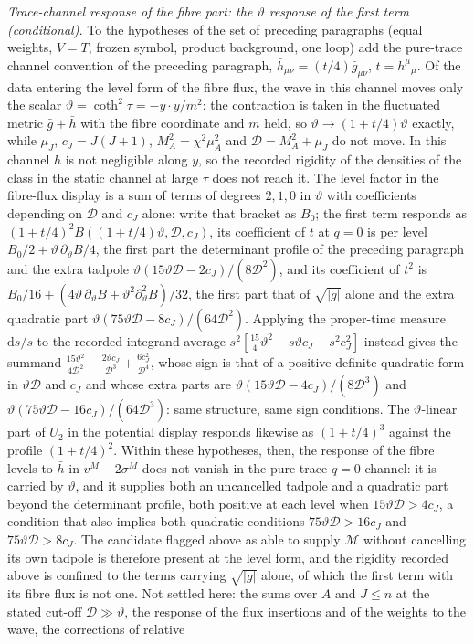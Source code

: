 \emph{Trace-channel response of the fibre part: the \(\vartheta\) response of the first term (conditional).} To the hypotheses of the set of preceding paragraphs (equal weights, \(V=T\), frozen symbol, product background, one loop) add the pure-trace channel convention of the preceding paragraph, \(\bar h_{\mu\nu}=(t/4)\bar g_{\mu\nu}\), \(t=h^\mu{}_\mu\). Of the data entering the level form of the fibre flux, the wave in this channel moves only the scalar \(\vartheta=\coth^2\tau=-y\cdot y/m^2\): the contraction is taken in the fluctuated metric \(\bar g+\bar h\) with the fibre coordinate and \(m\) held, so \(\vartheta\to(1+t/4)\vartheta\) exactly, while \(\mu_J\), \(c_J=J(J+1)\), \(M_A^2=\chi^2\mu_A^2\) and \(\mathcal D=M_A^2+\mu_J\) do not move. In this channel \(\bar h\) is not negligible along \(y\), so the recorded rigidity of the densities of the class in the static channel at large \(\tau\) does not reach it. The level factor in the fibre-flux display is a sum of terms of degrees \(2,1,0\) in \(\vartheta\) with coefficients depending on \(\mathcal D\) and \(c_J\) alone: write that bracket as \(B_0\); the first term responds as \((1+t/4)^2B((1+t/4)\vartheta,\mathcal D,c_J)\), its coefficient of \(t\) at \(q=0\) is per level \(B_0/2+\vartheta\,\partial_\vartheta B/4\), the first part the determinant profile of the preceding paragraph and the extra tadpole \(\vartheta(15\vartheta\mathcal D-2c_J)/(8\mathcal D^2)\), and its coefficient of \(t^2\) is \(B_0/16+(4\vartheta\,\partial_\vartheta B+\vartheta^2\partial_\vartheta^2B)/32\), the first part that of \(\sqrt{|g|}\) alone and the extra quadratic part \(\vartheta(75\vartheta\mathcal D-8c_J)/(64\mathcal D^2)\). Applying the proper-time measure \(\mathrm ds/s\) to the recorded integrand average \(s^2[\tfrac{15}4\vartheta^2-s\vartheta c_J+s^2c_J^2]\) instead gives the summand \(\tfrac{15\vartheta^2}{4\mathcal D^2}-\tfrac{2\vartheta c_J}{\mathcal D^3}+\tfrac{6c_J^2}{\mathcal D^4}\), whose sign is that of a positive definite quadratic form in \(\vartheta\mathcal D\) and \(c_J\) and whose extra parts are \(\vartheta(15\vartheta\mathcal D-4c_J)/(8\mathcal D^3)\) and \(\vartheta(75\vartheta\mathcal D-16c_J)/(64\mathcal D^3)\): same structure, same sign conditions. The \(\vartheta\)-linear part of \(U_2\) in the potential display responds likewise as \((1+t/4)^3\) against the profile \((1+t/4)^2\). Within these hypotheses, then, the response of the fibre levels to \(\bar h\) in \(v^M-2\sigma^M\) does not vanish in the pure-trace \(q=0\) channel: it is carried by \(\vartheta\), and it supplies both an uncancelled tadpole and a quadratic part beyond the determinant profile, both positive at each level when \(15\vartheta\mathcal D>4c_J\), a condition that also implies both quadratic conditions \(75\vartheta\mathcal D>16c_J\) and \(75\vartheta\mathcal D>8c_J\). The candidate flagged above as able to supply \(\mathcal M\) without cancelling its own tadpole is therefore present at the level form, and the rigidity recorded above is confined to the terms carrying \(\sqrt{|g|}\) alone, of which the first term with its fibre flux is not one. Not settled here: the sums over \(A\) and \(J\le n\) at the stated cut-off \(\mathcal D\gg\vartheta\), the response of the flux insertions and of the weights to the wave, the corrections of relative 